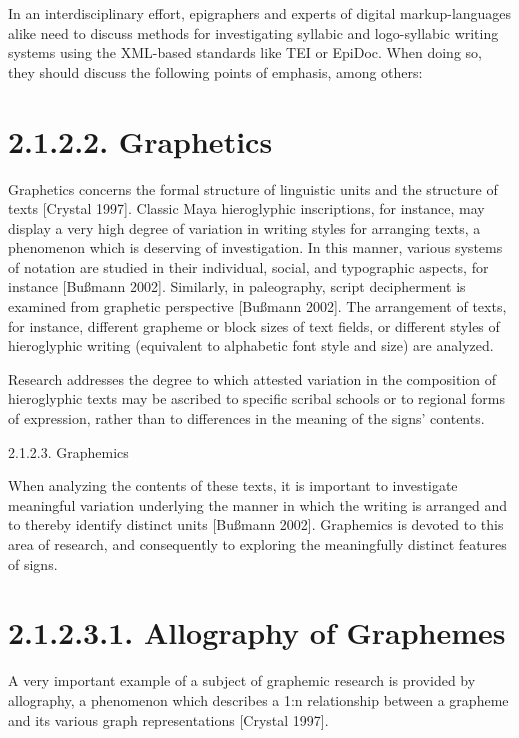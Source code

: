\documentclass[amsthm,ebook]{saparticle}
\begin{document}
In an interdisciplinary effort, epigraphers and experts of digital markup-languages alike need to discuss methods for
investigating syllabic and logo-syllabic writing systems using the XML-based standards like TEI or EpiDoc. When doing
so, they should discuss the following points of emphasis, among others: 


\bigskip

\section[2.1.2.2. Graphetics ]{2.1.2.2. Graphetics }
Graphetics concerns the formal structure of linguistic units and the structure of texts [Crystal 1997]. Classic Maya
hieroglyphic inscriptions, for instance, may display a very high degree of variation in writing styles for arranging
texts, a phenomenon which is deserving of investigation. In this manner, various systems of notation are studied in
their individual, social, and typographic aspects, for instance [Bußmann 2002]. Similarly, in paleography, script
decipherment is examined from graphetic perspective [Bußmann 2002]. The arrangement of texts, for instance, different
grapheme or block sizes of text fields, or different styles of hieroglyphic writing (equivalent to alphabetic font
style and size) are analyzed. 

Research addresses the degree to which attested variation in the composition of hieroglyphic texts may be ascribed to
specific scribal schools or to regional forms of expression, rather than to differences in the meaning of the signs’
contents. 


\bigskip

2.1.2.3. Graphemics 

When analyzing the contents of these texts, it is important to investigate meaningful variation underlying the manner in
which the writing is arranged and to thereby identify distinct units [Bußmann 2002]. Graphemics is devoted to this area
of research, and consequently to exploring the meaningfully distinct features of signs. 


\bigskip

\section[2.1.2.3.1. Allography of Graphemes ]{2.1.2.3.1. Allography of Graphemes }
A very important example of a subject of graphemic research is provided by allography, a phenomenon which describes a
1:n relationship between a grapheme and its various graph representations [Crystal 1997]. 
\end{document}
